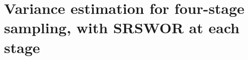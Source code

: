 \begin{comment}
\;-\;\sum_{i\in s^{(1)}}\,\dfrac{\widehat{V}_{i}(s^{(2+)}_{i})}{\left(\pi^{(1)}_{i}\right)^{2}}
\\
&=&
\sum_{i\in s^{(1)}}\,\sum_{j\in s^{(1)}}\,
\dfrac{\Delta^{(1)}_{ij}}{\pi^{(1)}_{ij}}
\cdot
\dfrac{\widehat{T}_{i}(s^{(2+)}_{i})}{\pi^{(1)}_{i}}
\cdot
\dfrac{\widehat{T}_{j}(s^{(2+)}_{j})}{\pi^{(1)}_{j}}
\;+\;\sum_{i\in s^{(1)}}\,\dfrac{1}{\pi^{(1)}_{i}} \left(1 - \dfrac{1}{\pi^{(1)}_{i}}\right) \, \widehat{V}_{i}(s^{(2+)}_{i})
\\
\widehat{\Var}^{(2+)}\!\left[\,\widehat{T}\,\right]\!(s)
&=&\sum_{i\in s^{(1)}}\,\dfrac{\widehat{V}_{i}(s^{(2+)}_{i})}{\left(\pi^{(1)}_{i}\right)^{2}}
\end{eqnarray*}
\end{corollary}
\end{comment}


\clearpage
\section{Variance estimation for four-stage sampling, with SRSWOR at each stage}
\setcounter{theorem}{0}
\setcounter{equation}{0}

